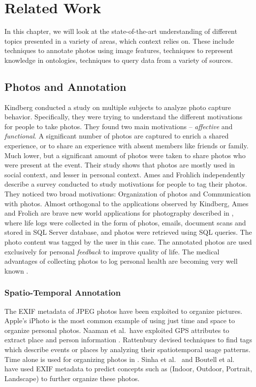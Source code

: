 \chapter{Related Work}

In this chapter, we will look at the state-of-the-art understanding of different topics presented in a variety of areas, which context relies on. These include techniques to annotate photos using image features, techniques to represent knowledge in ontologies, techniques to query data from a variety of sources.

\section{Photos and Annotation}

Kindberg \cite{kindberg2005ubiquitous} conducted a study on multiple subjects to analyze photo capture behavior. Specifically, they were trying to understand the different motivations for people to take photos. They found two main motivations -- \textit{affective} and \textit{functional}. A significant number of photos are captured to enrich a shared experience, or to share an experience with absent members like friends or family. Much lower, but a significant amount of photos were taken to share photos who were present at the event. Their study shows that photos are mostly used in social context, and lesser in personal context. Ames and Frohlich \cite{ames2007we, frohlich2002requirements} independently describe a survey conducted to study motivations for people to tag their photos. They noticed two broad motivations: Organization of photos and Communication with photos. Almost orthogonal to the applications observed by Kindberg, Ames and Frolich are brave new world applications for photography described in \cite{gemmell2002mylifebits, dumais2003stuff}, where life logs were collected in the form of photos, emails, document scans and stored in SQL Server database, and photos were retrieved using SQL queries. The photo content was tagged by the user in this case. The annotated photos are used exclusively for personal \textit{feedback} to improve quality of life. The medical advantages of collecting photos to log personal health are becoming very well known \cite{bell2010total}.

\subsection{Spatio-Temporal Annotation}
The EXIF metadata of JPEG photos have been exploited to organize pictures. Apple's iPhoto is the most common example of using just time and space to organize personal photos. Naaman et al.\ have exploited GPS attributes to extract place and person information \cite{naaman2005leveraging, naaman2005identity}. Rattenbury \cite{rattenbury2009methods} devised techniques to find tags which describe events or places by analyzing their spatiotemporal usage patterns. Time alone is used for organizing photos in \cite{graham2002time, hailpern2011youpivot}. Sinha et al.\ \cite{sinha2008concept} and Boutell et al.\ \cite{boutell2005beyond} have used EXIF metadata to predict concepts such as (Indoor, Outdoor, Portrait, Landscape) to further organize these photos.

